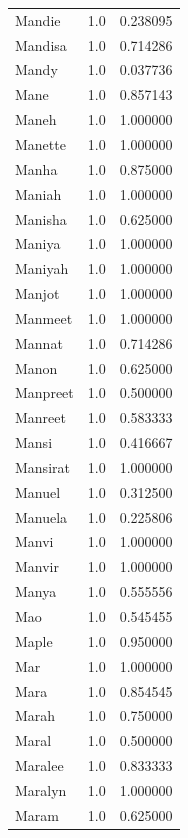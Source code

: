 \documentclass[
  letterpaper,
  DIV=11,
  numbers=noendperiod]{scrreprt}
\begin{document}
\begin{tabular}{lrr}
Mandie          &   1.0 &   0.238095 \\
Mandisa         &   1.0 &   0.714286 \\
Mandy           &   1.0 &   0.037736 \\
Mane            &   1.0 &   0.857143 \\
Maneh           &   1.0 &   1.000000 \\
Manette         &   1.0 &   1.000000 \\
Manha           &   1.0 &   0.875000 \\
Maniah          &   1.0 &   1.000000 \\
Manisha         &   1.0 &   0.625000 \\
Maniya          &   1.0 &   1.000000 \\
Maniyah         &   1.0 &   1.000000 \\
Manjot          &   1.0 &   1.000000 \\
Manmeet         &   1.0 &   1.000000 \\
Mannat          &   1.0 &   0.714286 \\
Manon           &   1.0 &   0.625000 \\
Manpreet        &   1.0 &   0.500000 \\
Manreet         &   1.0 &   0.583333 \\
Mansi           &   1.0 &   0.416667 \\
Mansirat        &   1.0 &   1.000000 \\
Manuel          &   1.0 &   0.312500 \\
Manuela         &   1.0 &   0.225806 \\
Manvi           &   1.0 &   1.000000 \\
Manvir          &   1.0 &   1.000000 \\
Manya           &   1.0 &   0.555556 \\
Mao             &   1.0 &   0.545455 \\
Maple           &   1.0 &   0.950000 \\
Mar             &   1.0 &   1.000000 \\
Mara            &   1.0 &   0.854545 \\
Marah           &   1.0 &   0.750000 \\
Maral           &   1.0 &   0.500000 \\
Maralee         &   1.0 &   0.833333 \\
Maralyn         &   1.0 &   1.000000 \\
Maram           &   1.0 &   0.625000 \\

\end{tabular}
\end{document}
